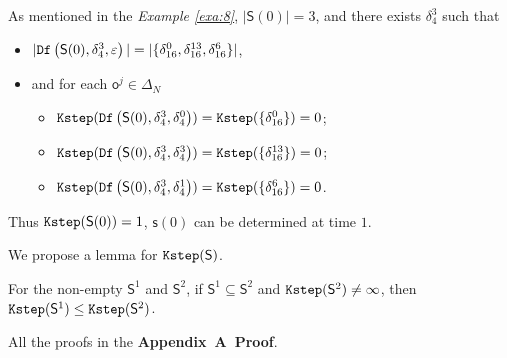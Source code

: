 \begin{example}\label{exa:9}
As mentioned in the {\em Example \ref{exa:8}}, $|\mathsf{S}(0)|=3$, and there exists $\delta_{4}^3$ such that 
 \begin{itemize}
 \item  $|{\tt Df}\left(\mathsf{S}(0),\delta_{4}^3,\varepsilon\right)|=|\{\delta_{16}^0,\delta_{16}^{13},\delta_{16}^6\}|$,
 \item   and for each $\mathsf{o}^{j}\in \Delta_N$
  \begin{itemize}
  \item   ${\tt Kstep}({\tt Df}\left(\mathsf{S}(0),\delta_{4}^3,\delta_{4}^0\right))={\tt Kstep}(\{\delta_{16}^0\})=0$;
 \item  ${\tt Kstep}({\tt Df}\left(\mathsf{S}(0),\delta_{4}^3,\delta_{4}^3\right))={\tt Kstep}(\{\delta_{16}^{13}\})=0$;
  \item  ${\tt Kstep}({\tt Df}\left(\mathsf{S}(0),\delta_{4}^3,\delta_{4}^1\right))={\tt Kstep}(\{\delta_{16}^{6}\})=0$.
 \end{itemize}
 \end{itemize}
Thus ${\tt Kstep}(\mathsf{S}(0))=1$, $\mathsf{s}(0)$ can be determined at time $1$.
\end{example}  

We propose a lemma for ${\tt Kstep}(\mathsf{S})$.

\begin{lemma}
For the non-empty $\mathsf{S}^{1}$ and $\mathsf{S}^{2}$, if $\mathsf{S}^{1}\subseteq\mathsf{S}^{2}$ and ${\tt Kstep}(\mathsf{S}^{2})\ne\infty$, then ${\tt Kstep}(\mathsf{S}^{1})\le{\tt Kstep}(\mathsf{S}^{2})$.%
  \label{lemm:1}
\end{lemma}

All the proofs in the {\bf Appendix~A~Proof}. 

